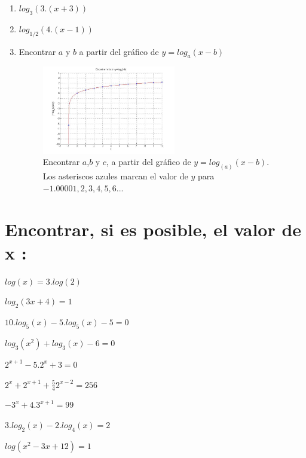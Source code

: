 \documentclass[a4paper,11pt,spanish,sans]{exam}
\begin{document}
\begin{enumerate}%
\item $log_3(3.(x+3))$

\item $log_{1/2}(4.(x-1))$

\item Encontrar $a$ y $b$  a partir del gráfico de $y=log_a(x-b)$
\begin{figure}[h!]
\centering
\includegraphics[width=0.55\textwidth]{encontrarlog3xmas1.jpg}
\caption{Encontrar $a$,$b$ y $c$,  a partir del gráfico de $y=log_(a)(x-b)$.
Los asteriscos azules marcan el valor de $y$ para $-1.00001, 2 , 3, 4, 5, 6...$}
\label{fig:logaritmo}
\end{figure}
\end{enumerate}

\section{Encontrar, si es posible, el valor de x :}

\begin{enumerate}
\begin{multicols}{2}

\item $log(x)=3.log(2)$
\item $log_2(3x+4)=1$
\item $10.log_5(x)-5.log_5(x)-5=0$%
\item $log_3(x^2)+log_3(x)-6=0$
\item $2^{x+1}-5.2^{x}+3=0$

\columnbreak

\item $2^x+2^{x+1}+\frac{5}{4}2^{x-2}=256$
\item $-3^x+4.3^{x+1}=99$
\item $3.log_2(x)-2.log_4(x)=2$
\item $log(x^2-3x+12)=1$

\end{multicols}
\end{enumerate}
\end{document}
